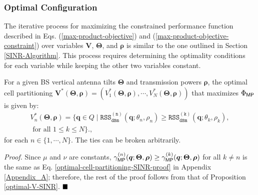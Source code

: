 \subsubsection{Optimal Configuration}\label{MP-Optimal-Configuration}

The iterative process for maximizing the constrained performance function described in Eqs. (\ref{max-product-objective}) and (\ref{max-product-objective-constraint}) over variables $\bm{V}$, $\bm{\Theta}$, and $\bm{\rho}$ is similar to the one outlined in Section \ref{SINR-Algorithm}. This process requires determining the optimality conditions for each variable while keeping the other two variables constant.

\begin{Proposition}\label{MP-optimal-cell}
For a given BS vertical antenna tilts $\bm{\Theta}$ and transmission powers $\bm{\rho}$, the optimal cell partitioning $\bm{V}^*(\bm{\Theta}, \bm{\rho}) = \left(V^*_1(\bm{\Theta}, \bm{\rho}), \cdots, V_N^*(\bm{\Theta}, \bm{\rho})\right)$ that maximizes $\Phi_{{\sf MP}}$ is given by:
\begin{multline}\label{optimal-cell-partitioning-MP}
    \!\!\!\!\! V_n^*(\bm{\Theta}, \bm{\rho}) = \big\{\bm{q} \in Q \mid \mathtt{RSS_{dBm}^{(n)}}(\bm{q}; \theta_n, \rho_n) \geq \mathtt{RSS_{dBm}^{(k)}}(\bm{q}; \theta_k, \rho_k), \\ \textrm{ for all } 1 \leq k \leq N \big\}.,
\end{multline}        
for each $n \in \{1, \cdots, N\}$. The ties can be broken arbitrarily.
\end{Proposition}
\textit{Proof. }
Since $\mu$ and $\nu$ are constants, $\gamma_{\sf MP}^{(n)}(\bm{q}; \mathbf{\Theta}, \bm{\rho}) \geq \gamma_{\sf MP}^{(k)}(\bm{q}; \mathbf{\Theta}, \bm{\rho})$ for all $k \neq n$ is the same as Eq. \eqref{optimal-cell-partitioning-SINR-proof} in Appendix \ref{Appendix_A}; therefore, the rest of the proof follows from that of Proposition \ref{optimal-V-SINR}. $\hfill\blacksquare$ 



